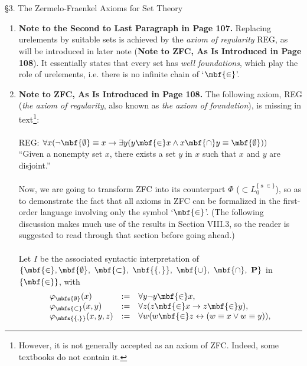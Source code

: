 \ 
\\
\\
{\large \S3. The Zermelo-Fraenkel Axioms for Set Theory}
\begin{enumerate}[1.]
\item \textbf{Note to the Second to Last Paragraph in Page 107.} Replacing urelements by suitable sets is achieved by the \emph{axiom of regularity} REG, as will be introduced in later note (\textbf{Note to ZFC, As Is Introduced in Page 108}). It essentially states that every set has \emph{well foundations}, which play the role of urelements, i.e. there is no infinite chain of `$\mbf{\in}$'.
%
\item \textbf{Note to ZFC, As Is Introduced in Page 108.} The following axiom, REG (\emph{the axiom of regularity}, also known as \emph{the axiom of foundation}), is missing in text\footnote{However, it is not generally accepted as an axiom of ZFC. Indeed, some textbooks do not contain it.}:\\
\\
REG: $\forall x (\neg \mbf{\emptyset} \equiv x \rightarrow \exists y (y \mbf{\in} x \land x \mbf{\cap} y \equiv \mbf{\emptyset}))$\\
``Given a nonempty set $x$, there exists a set $y$ in $x$ such that $x$ and $y$ are disjoint.''\\
\\
Now, we are going to transform ZFC into its counterpart $\Phi$ ($\subset L_0^{\{ \mbfs{\in} \}}$), so as to demonstrate the fact that all axioms in ZFC can be formalized in the first-order language involving only the symbol `$\mbf{\in}$'. (The following discussion makes much use of the results in Section VIII.3, so the reader is suggested to read through that section before going ahead.)\\
\\
Let $I$ be the associated syntactic interpretation of $\{ \mbf{\in}, \mbf{\emptyset}, \ \mbf{\subset}, \ \mbf{ \{ , \} }, \ \mbf{\cup}, \ \mbf{\cap}, \ \mathbf{P} \}$ in $\{ \mbf{\in} \}$, with
\[
\begin{array}{lll}
\varphi_\mbfs{\emptyset}(x)   & := & \forall y \neg y \mbf{\in} x, \cr
\varphi_\mbfs{\subset}(x,y)     & := & \forall z (z \mbf{\in} x \rightarrow z \mbf{\in} y), \cr
\varphi_{\mbfs{ \{ , \} }}(x,y,z)    & := & \forall w (w \mbf{\in} z \leftrightarrow (w \equiv x \lor w \equiv y)), \cr

\end{array}\]
\end{enumerate}
